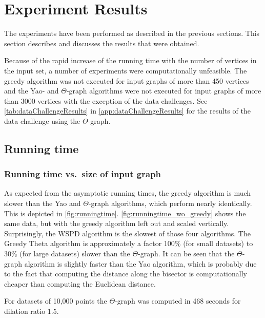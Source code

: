 \documentclass[a4paper,twoside,11pt,hidelinks]{article}
\theoremstyle{plain}
\theoremstyle{definition}  %
\begin{document}
\section{Experiment Results}
\label{sec:results}
The experiments have been performed as described in the previous sections. This
section describes and discusses the results that were obtained.

Because of the rapid increase of the running time with the number of vertices in
the input set, a number of experiments were computationally unfeasible. The
greedy algorithm was not executed for input graphs of more than 450 vertices and
the Yao- and $\Theta$-graph algorithms were not executed for input graphs of
more than 3000 vertices with the exception of the data challenges. See
\autoref{tab:dataChallengeResults} in \autoref{app:dataChallengeResults} for the
results of the data challenge using the $\Theta$-graph.

\subsection{Running time}
\label{sec:results:runningtime}

\subsubsection{Running time vs.\ size of input graph}

As expected from the asymptotic running times, the greedy algorithm is much slower than the Yao and $\Theta$-graph algorithms, which perform nearly identically. This is depicted in \autoref{fig:runningtime}. \autoref{fig:runningtime_wo_greedy} shows the same data, but with the greedy algorithm left out and scaled vertically. Surprisingly, the WSPD algorithm is the slowest of those four algorithms. The Greedy Theta algorithm is approximately a factor 100\% (for small datasets) to 30\% (for large datasets) slower than the $\Theta$-graph. It can  be seen that the $\Theta$-graph algorithm is slightly faster than the Yao algorithm, which is probably due to the fact that computing the distance along the bisector is computationally cheaper than computing the Euclidean distance.

For datasets of 10,000 points the $\Theta$-graph was computed in 468 seconds for dilation ratio 1.5.
\end{document}
